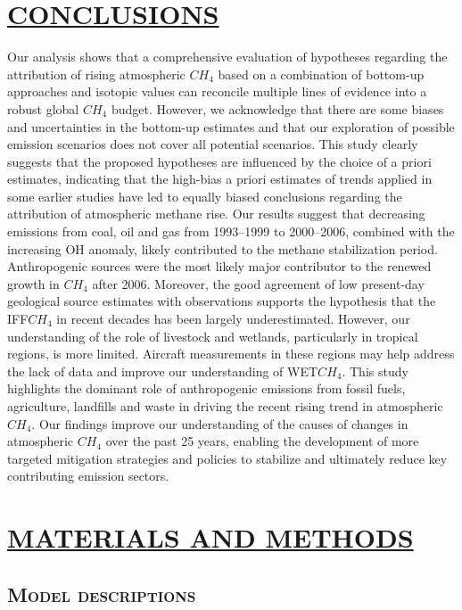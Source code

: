 \documentclass[a4paper,12pt]{article}
\begin{document}
\section*{\textbf{\textsc{\Large{\underline{CONCLUSIONS}}}}}

\small{Our analysis shows that a comprehensive evaluation of hypotheses regarding the attribution of rising atmospheric $CH_{4}$ based on a combination of bottom-up approaches and isotopic values can reconcile multiple lines of evidence into a robust global $CH_{4}$ budget. However, we acknowledge that there are some biases and uncertainties in the bottom-up estimates and that our exploration of possible emission scenarios does not cover all potential scenarios. This study clearly suggests that the proposed hypotheses are influenced by the choice of a priori estimates, indicating that the high-bias a priori estimates of trends applied in some earlier studies have led to equally biased conclusions regarding the attribution of atmospheric methane rise. Our results suggest that decreasing emissions from coal, oil and gas from 1993–1999 to 2000–2006, combined with the increasing OH anomaly, likely contributed to the methane stabilization period. Anthropogenic sources were the most likely major contributor to the renewed growth in $CH_{4}$ after 2006. Moreover, the good agreement of low present-day geological source estimates with observations supports the hypothesis that the IFF$CH_{4}$ in recent decades has been largely underestimated. However, our understanding of the role of livestock and wetlands, particularly in tropical regions, is more limited. Aircraft measurements in these regions may help address the lack of data and improve our understanding of WET$CH_{4}$. This study highlights the dominant role of anthropogenic emissions from fossil fuels, agriculture, landfills and waste in driving the recent rising trend in atmospheric $CH_{4}$. Our findings improve our understanding of the causes of changes in atmospheric $CH_{4}$ over the past 25 years, enabling the development of more targeted mitigation strategies and policies to stabilize and ultimately reduce key contributing emission sectors.}

\section*{\textbf{\textsc{\Large{\underline{MATERIALS AND METHODS}}}}}

\subsection*{\textbf{\textsc{\large{Model descriptions}}}}\\
\end{document}
